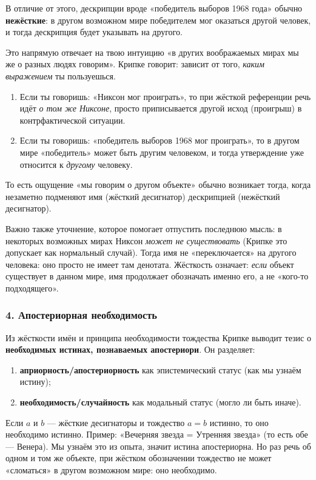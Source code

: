 \documentclass[a4paper,12pt]{article}
\begin{document}
В отличие от этого, дескрипции вроде «победитель выборов 1968 года» обычно \textbf{нежёсткие}: в другом возможном мире победителем мог оказаться другой человек, и тогда дескрипция будет указывать на другого.

Это напрямую отвечает на твою интуицию «в других воображаемых мирах мы же о разных людях говорим». Крипке говорит: зависит от того, \emph{каким выражением} ты пользуешься.
\begin{enumerate}
    \item Если ты говоришь: «Никсон мог проиграть», то при жёсткой референции речь идёт \emph{о том же Никсоне}, просто приписывается другой исход (проигрыш) в контрфактической ситуации.
    \item Если ты говоришь: «победитель выборов 1968 мог проиграть», то в другом мире «победитель» может быть другим человеком, и тогда утверждение уже относится к \emph{другому} человеку.
\end{enumerate}
То есть ощущение «мы говорим о другом объекте» обычно возникает тогда, когда незаметно подменяют имя (жёсткий десигнатор) дескрипцией (нежёсткий десигнатор).

Важно также уточнение, которое помогает отпустить последнюю мысль: в некоторых возможных мирах Никсон \emph{может не существовать} (Крипке это допускает как нормальный случай). Тогда имя не «переключается» на другого человека: оно просто не имеет там денотата. Жёсткость означает: \emph{если} объект существует в данном мире, имя продолжает обозначать именно его, а не «кого-то подходящего».

\subsubsection*{4. Апостериорная необходимость}

Из жёсткости имён и принципа необходимости тождества Крипке выводит тезис о \textbf{необходимых истинах, познаваемых апостериори}. Он разделяет:
\begin{enumerate}
    \item \textbf{априорность/апостериорность} как эпистемический статус (как мы узнаём истину);
    \item \textbf{необходимость/случайность} как модальный статус (могло ли быть иначе).
\end{enumerate}

Если $a$ и $b$ — жёсткие десигнаторы и тождество $a=b$ истинно, то оно необходимо истинно. Пример: «Вечерняя звезда = Утренняя звезда» (то есть обе — Венера). Мы узнаём это из опыта, значит истина апостериорна. Но раз речь об одном и том же объекте, при жёстком обозначении тождество не может «сломаться» в другом возможном мире: оно необходимо.
\end{document}
